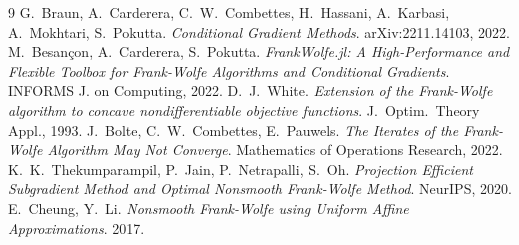 \documentclass[11pt,a4paper]{article}
\theoremstyle{plain}
\theoremstyle{remark}
\begin{document}
\begin{thebibliography}{9}
 G.~Braun, A.~Carderera, C.~W.~Combettes, H.~Hassani,
  A.~Karbasi, A.~Mokhtari, S.~Pokutta.
  \emph{Conditional Gradient Methods}. arXiv:2211.14103, 2022.
 M.~Besan\c{c}on, A.~Carderera, S.~Pokutta.
  \emph{FrankWolfe.jl: A High-Performance and Flexible Toolbox for Frank-Wolfe
  Algorithms and Conditional Gradients}. INFORMS J. on Computing, 2022.
 D.~J.~White. \emph{Extension of the Frank-Wolfe algorithm to
  concave nondifferentiable objective functions}. J.~Optim.~Theory Appl., 1993.
 J.~Bolte, C.~W.~Combettes, E.~Pauwels.
  \emph{The Iterates of the Frank-Wolfe Algorithm May Not Converge}.
  Mathematics of Operations Research, 2022.
 K.~K.~Thekumparampil, P.~Jain, P.~Netrapalli, S.~Oh.
  \emph{Projection Efficient Subgradient Method and Optimal Nonsmooth
  Frank-Wolfe Method}. NeurIPS, 2020.
 E.~Cheung, Y.~Li. \emph{Nonsmooth Frank-Wolfe using Uniform
  Affine Approximations}. 2017.
\end{thebibliography}
\end{document}

